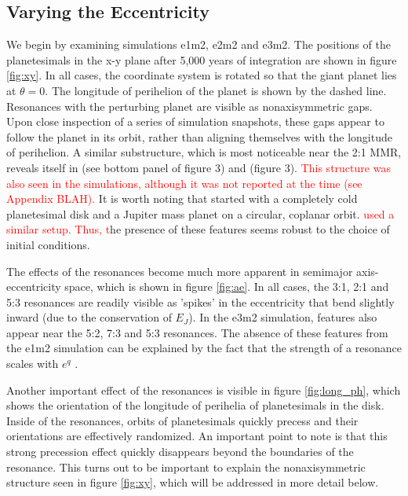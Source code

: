 \documentclass[twocolumn]{aastex63}
\newcommand{\ACBc}[1]{\textcolor{red}{#1}}
\begin{document}
\subsection{Varying the Eccentricity}

We begin by examining simulations e1m2, e2m2 and e3m2. The positions of the planetesimals in the x-y plane after 5,000 years of integration are 
shown in figure \ref{fig:xy}. In all cases, the coordinate system is rotated so that the giant planet lies at $\theta = 0$. The longitude of perihelion of 
the planet is shown by the dashed line. Resonances with the perturbing planet are visible as nonaxisymmetric gaps. Upon close inspection of a 
series of simulation snapshots, these gaps appear to follow the planet in its orbit, rather than aligning themselves with the longitude of perihelion. A 
similar substructure, which is most noticeable near the 2:1 MMR, reveals itself in \citet{2000Icar..143...45R} (see bottom panel of figure 3) and 
\citet{2016ApJ...818..159T} (figure 3). \ACBc{This structure was also seen in the \citet{2017ApJ...850..103B} simulations, although it was not reported at the time (see Appendix BLAH).}  It is worth noting that \citet{2000Icar..143...45R} started with a completely cold planetesimal disk and a Jupiter 
mass planet on a circular, coplanar orbit. \ACBc{ \citet{2017ApJ...850..103B} used a similar setup.  Thus, t}he presence of these features seems robust to the choice of initial conditions.

The effects of the resonances become much more apparent in semimajor axis-eccentricity space, which is shown in figure \ref{fig:ae}. In all cases, 
the 3:1, 2:1 and 5:3 resonances are readily visible as 'spikes' in the eccentricity that bend slightly inward (due to the conservation of $E_{J}$). In the 
e3m2 simulation, features also appear near the 5:2, 7:3 and 5:3 resonances. The absence of these features from the e1m2 simulation can be 
explained by the fact that the strength of a resonance scales with $e^{q}$ \citep{1994PhyD...77..289M}.

Another important effect of the resonances is visible in figure \ref{fig:long_ph}, which shows the orientation of the longitude of perihelia of 
planetesimals in the disk. Inside of the resonances, orbits of planetesimals quickly precess and their orientations are effectively randomized. An 
important point to note is that this strong precession effect quickly disappears beyond the boundaries of the resonance. This turns out to be 
important to explain the nonaxisymmetric structure seen in figure \ref{fig:xy}, which will be addressed in more detail below.
\end{document}
